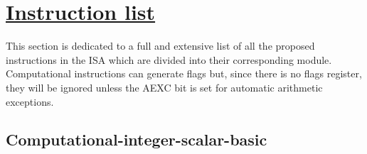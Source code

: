 \section[Instruction list]{\LARGE\underline{Instruction list}}

    \vspace{10pt}

    This section is dedicated to a full and extensive list of all the proposed instructions in the ISA which are divided into their corresponding module. Computational instructions can generate flags but, since there is no flags register, they will be ignored unless the AEXC bit is set for automatic arithmetic exceptions.

    \subsection{Computational-integer-scalar-basic}

